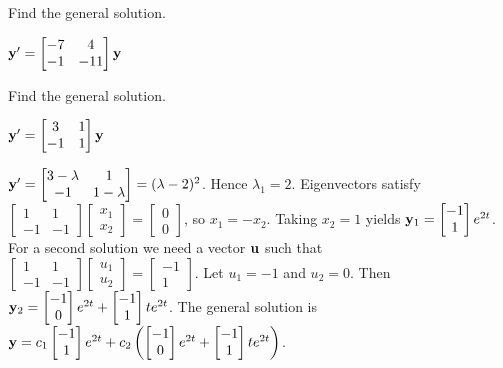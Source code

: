 \documentclass{ximera}
\begin{document}
 \begin{problem}\label{exer:10.5.3}
 Find the general solution.
 
 $ {\bf y}'= \begin{bmatrix}-7&4\\-1&-11\end{bmatrix}{\bf y}$ 
 \end{problem}

 \begin{problem}\label{exer:10.5.4} 
 Find the general solution.
 
 $ {\bf y}'= \begin{bmatrix}3&1\\-1&1\end{bmatrix}{\bf y}$

 \begin{solution}
      $ {\bf y}'=\begin{bmatrix}3-\lambda&1\\-1&1-\lambda\end{bmatrix}=(\lambda-2)^2$.
Hence $\lambda_1=2$.
Eigenvectors   satisfy
$  \begin{bmatrix}1&1\\-1&-1\end{bmatrix} \begin{bmatrix}x_1\\x_2\end{bmatrix}= \begin{bmatrix}0\\0\end{bmatrix}$,
so $x_1=-x_2$.  Taking $x_2=1$ yields
${\bf y}_1=  \begin{bmatrix}-1\\1\end{bmatrix}e^{2t}$.
For a second solution we need a vector ${\bf u}$
such that $  \begin{bmatrix}1&1\\-1&-1\end{bmatrix} \begin{bmatrix}u_1\\u_2\end{bmatrix}
= \begin{bmatrix}-1\\1\end{bmatrix}$. Let $u_1=-1$ and $u_2=0$. Then
${\bf y}_2=  \begin{bmatrix}-1\\0\end{bmatrix}e^{2t}+  \begin{bmatrix}-1\\1\end{bmatrix}te^{2t}$.
The general solution is
 ${\bf y}= 
c_1 \begin{bmatrix}-1\\1\end{bmatrix}e^{2t}+c_2\left( \begin{bmatrix}-1\\0\end{bmatrix}
e^{2t}+ \begin{bmatrix}-1\\1\end{bmatrix}te^{2t}\right)$.
 \end{solution}
 \end{problem}
\end{document}
